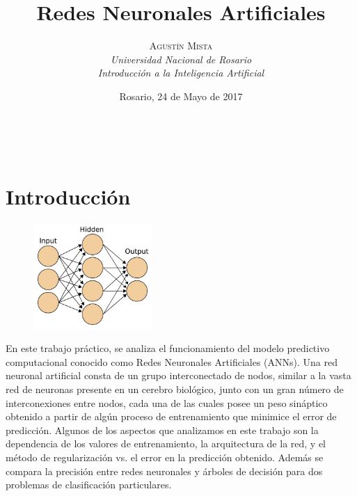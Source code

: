 \documentclass[a4paper, 11pt]{article} %
\title{\textbf{Redes Neuronales Artificiales}}
\author{
	\textsc{Agustín Mista}\\
	\textit{Universidad Nacional de Rosario}\\
 	\textit{Introducción a la Inteligencia Artificial}
}
\date{Rosario, 24 de Mayo de 2017}
\makeatletter
\renewcommand{\maketitle}{ %
\begin{flushright} %
{\LARGE\@title} %

\vspace{50pt} %

{\large\@author} %
\\\@date %

\vspace{40pt} %
\end{flushright}
}
\makeatother
\begin{document}
\maketitle %




\vspace{20pt} %


\section*{Introducción}

\begin{figure}
	\begin{center}
		\vspace{-20pt}
		\includegraphics[width=0.4\textwidth]{ann.jpg}
		\vspace{-20pt}
	\end{center}
\end{figure}

En este trabajo práctico, se analiza el funcionamiento del modelo predictivo
computacional conocido como Redes Neuronales Artificiales (ANNs). Una red
neuronal artificial consta de un grupo interconectado de nodos, similar a la
vasta red de neuronas presente en un cerebro biológico, junto con un gran
número de interconexiones entre nodos, cada una de las cuales posee un peso
sináptico obtenido a partir de algún proceso de entrenamiento que minimice el
error de predicción. Algunos de los aspectos que analizamos en este trabajo son
la dependencia de los valores de entrenamiento, la arquitectura de la red, y el
método de regularización vs. el error en la predicción obtenido. Además se
compara la precisión entre redes neuronales y árboles de decisión para dos
problemas de clasificación particulares.
\end{document}
